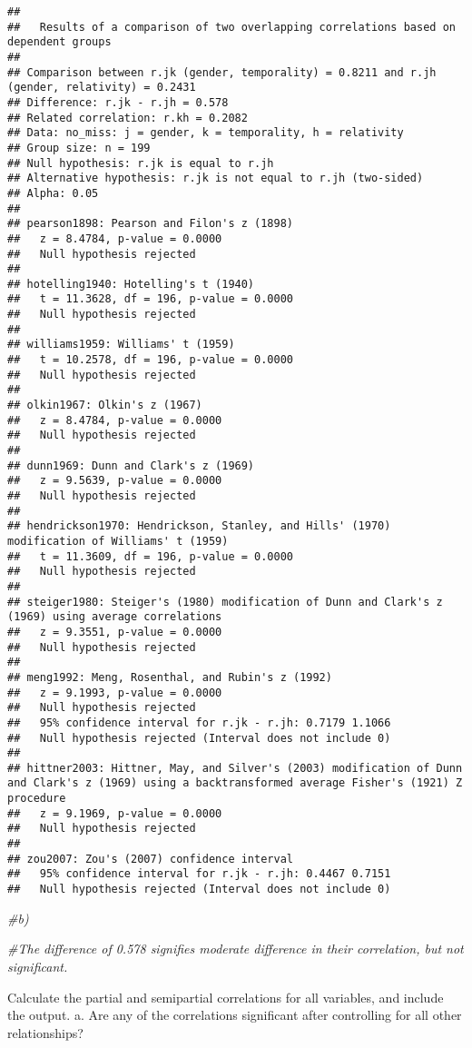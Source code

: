 \documentclass[
]{article}
\newenvironment{Shaded}{\begin{snugshade}}{\end{snugshade}}
\newcommand{\CommentTok}[1]{\textcolor[rgb]{0.56,0.35,0.01}{\textit{#1}}}
\begin{document}
\begin{verbatim}
## 
##   Results of a comparison of two overlapping correlations based on dependent groups
## 
## Comparison between r.jk (gender, temporality) = 0.8211 and r.jh (gender, relativity) = 0.2431
## Difference: r.jk - r.jh = 0.578
## Related correlation: r.kh = 0.2082
## Data: no_miss: j = gender, k = temporality, h = relativity
## Group size: n = 199
## Null hypothesis: r.jk is equal to r.jh
## Alternative hypothesis: r.jk is not equal to r.jh (two-sided)
## Alpha: 0.05
## 
## pearson1898: Pearson and Filon's z (1898)
##   z = 8.4784, p-value = 0.0000
##   Null hypothesis rejected
## 
## hotelling1940: Hotelling's t (1940)
##   t = 11.3628, df = 196, p-value = 0.0000
##   Null hypothesis rejected
## 
## williams1959: Williams' t (1959)
##   t = 10.2578, df = 196, p-value = 0.0000
##   Null hypothesis rejected
## 
## olkin1967: Olkin's z (1967)
##   z = 8.4784, p-value = 0.0000
##   Null hypothesis rejected
## 
## dunn1969: Dunn and Clark's z (1969)
##   z = 9.5639, p-value = 0.0000
##   Null hypothesis rejected
## 
## hendrickson1970: Hendrickson, Stanley, and Hills' (1970) modification of Williams' t (1959)
##   t = 11.3609, df = 196, p-value = 0.0000
##   Null hypothesis rejected
## 
## steiger1980: Steiger's (1980) modification of Dunn and Clark's z (1969) using average correlations
##   z = 9.3551, p-value = 0.0000
##   Null hypothesis rejected
## 
## meng1992: Meng, Rosenthal, and Rubin's z (1992)
##   z = 9.1993, p-value = 0.0000
##   Null hypothesis rejected
##   95% confidence interval for r.jk - r.jh: 0.7179 1.1066
##   Null hypothesis rejected (Interval does not include 0)
## 
## hittner2003: Hittner, May, and Silver's (2003) modification of Dunn and Clark's z (1969) using a backtransformed average Fisher's (1921) Z procedure
##   z = 9.1969, p-value = 0.0000
##   Null hypothesis rejected
## 
## zou2007: Zou's (2007) confidence interval
##   95% confidence interval for r.jk - r.jh: 0.4467 0.7151
##   Null hypothesis rejected (Interval does not include 0)
\end{verbatim}

\begin{Shaded}
\begin{Highlighting}[]
\CommentTok{#b)}

\CommentTok{#The difference of 0.578 signifies moderate difference in their correlation, but not significant.}
\end{Highlighting}
\end{Shaded}

Calculate the partial and semipartial correlations for all variables,
and include the output. a. Are any of the correlations significant after
controlling for all other relationships?
\end{document}
